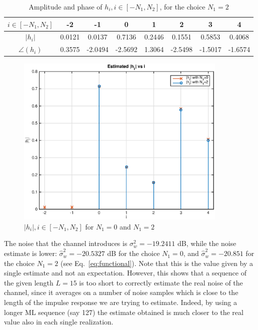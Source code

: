\documentclass[10pt]{article}
\begin{document}
\begin{table}[h!]
	\centering
	\begin{tabular}{c|c|c|c|c|c|c|c}
		$i \in [-N_1, N_2]$ & -2 & -1 & 0 & 1 & 2 & 3 & 4 \\ \hline
		$|h_i|$ 	&	0.0121  &  0.0137  &  0.7136   & 0.2446  &  0.1551  &  0.5853  &  0.4068 \\
		$\angle(h_i)$ &	0.3575  & -2.0494  & -2.5692   & 1.3064  & -2.5498  & -1.5017  & -1.6574 \\
	\end{tabular}
	\caption{Amplitude and phase of $h_i, i \in [-N_1, N_2]$, for the choice $N_1 = 2$}
	\label{table:h2}
\end{table}

\begin{figure}[h!]
 \centering
 \includegraphics[width = 0.9\textwidth]{hi_p1}
 \caption{$|h_i|, i \in [-N_1, N_2]$ for $N_1 = 0$ and $N_1 = 2$}
 \label{fig:hi_p1}
\end{figure}

The noise that the channel introduces is $\sigma_w^2 = -19.2411$ dB, while the noise estimate is lower: $\hat{\sigma}_w^2 = -20.5327$ dB for the choice $N_1 = 0$, and $\hat{\sigma}_w^2 = -20.851$ for the choice $N_1 = 2$ (see Eq.~\ref{eq:functional}). Note that this is the value given by a single estimate and not an expectation. However, this shows that a sequence of the given length $L = 15$ is too short to correctly estimate the real noise of the channel, since it averages on a number of noise samples which is close to the length of the impulse response we are trying to estimate. Indeed, by using a longer ML sequence (say 127) the estimate obtained is much closer to the real value also in each single realization. 
\end{document}
